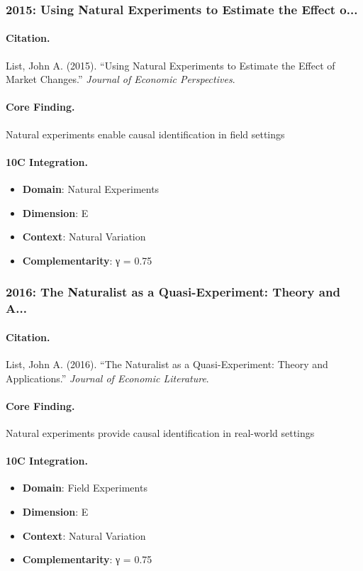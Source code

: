 \subsubsection{2015: Using Natural Experiments to Estimate the Effect o...}

\paragraph{Citation.}
List, John A. (2015). ``Using Natural Experiments to Estimate the Effect of Market Changes.''
\textit{Journal of Economic Perspectives}.

\paragraph{Core Finding.}
Natural experiments enable causal identification in field settings

\paragraph{10C Integration.}
\begin{itemize}[nosep]
  \item \textbf{Domain}: Natural Experiments
  \item \textbf{Dimension}: E
  \item \textbf{Context}: Natural Variation
  \item \textbf{Complementarity}: γ = 0.75
\end{itemize}


\subsubsection{2016: The Naturalist as a Quasi-Experiment: Theory and A...}

\paragraph{Citation.}
List, John A. (2016). ``The Naturalist as a Quasi-Experiment: Theory and Applications.''
\textit{Journal of Economic Literature}.

\paragraph{Core Finding.}
Natural experiments provide causal identification in real-world settings

\paragraph{10C Integration.}
\begin{itemize}[nosep]
  \item \textbf{Domain}: Field Experiments
  \item \textbf{Dimension}: E
  \item \textbf{Context}: Natural Variation
  \item \textbf{Complementarity}: γ = 0.75
\end{itemize}


